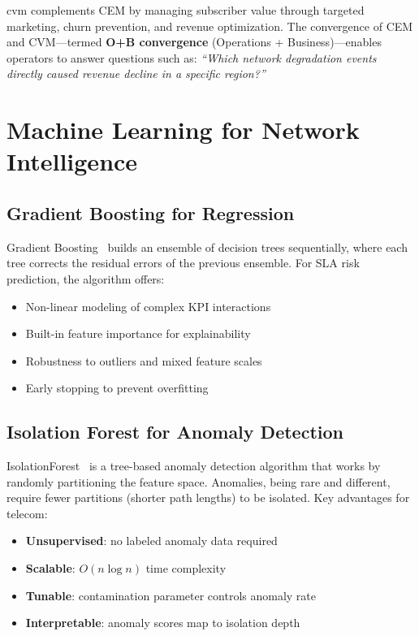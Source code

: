 \gls{cvm} complements CEM by managing subscriber value through targeted marketing, churn prevention, and revenue optimization. The convergence of CEM and CVM---termed \textbf{O+B convergence} (Operations + Business)---enables operators to answer questions such as: \textit{``Which network degradation events directly caused revenue decline in a specific region?''}

\section{Machine Learning for Network Intelligence}

\subsection{Gradient Boosting for Regression}

Gradient Boosting~\cite{friedman2001gbr} builds an ensemble of decision trees sequentially, where each tree corrects the residual errors of the previous ensemble. For SLA risk prediction, the algorithm offers:

\begin{itemize}
    \item Non-linear modeling of complex KPI interactions
    \item Built-in feature importance for explainability
    \item Robustness to outliers and mixed feature scales
    \item Early stopping to prevent overfitting
\end{itemize}

\subsection{Isolation Forest for Anomaly Detection}

IsolationForest~\cite{liu2008iforest} is a tree-based anomaly detection algorithm that works by randomly partitioning the feature space. Anomalies, being rare and different, require fewer partitions (shorter path lengths) to be isolated. Key advantages for telecom:

\begin{itemize}
    \item \textbf{Unsupervised}: no labeled anomaly data required
    \item \textbf{Scalable}: $O(n \log n)$ time complexity
    \item \textbf{Tunable}: contamination parameter controls anomaly rate
    \item \textbf{Interpretable}: anomaly scores map to isolation depth
\end{itemize}

